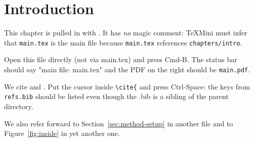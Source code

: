 \chapter{Introduction}\label{ch:intro}

This chapter is pulled in with \verb||. It has \emph{no} magic comment:
TeXMini must infer that \texttt{main.tex} is the main file because
\texttt{main.tex} references \texttt{chapters/intro}.

Open this file directly (not via main.tex) and press Cmd-B. The status bar should
say "main file: main.tex" and the PDF on the right should be \texttt{main.pdf}.

We cite \citet{knuth1984} and \citep{lamport1994, goossens1994}. Put the cursor
inside \verb|\cite{| and press Ctrl-Space: the keys from \texttt{refs.bib} should be
listed even though the .bib is a sibling of the parent directory.

We also refer forward to Section~\ref{sec:method-setup} in another file and to
Figure~\ref{fig:inside} in yet another one.
